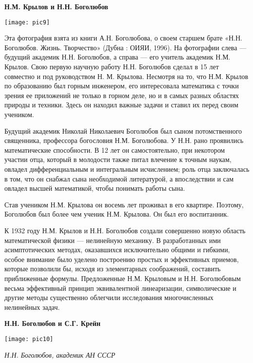 \begin{center}
{\bf Н.М. Крылов и Н.Н. Боголюбов}

\vspace{3mm}

\texttt{[image: pic9]}

\end{center}

Эта фотография взята из книги А.Н. Боголюбова, о своем старшем брате «Н.Н. Боголюбов. Жизнь. Творчество» (Дубна : ОИЯИ, 1996). На фотографии слева — будущий академик Н.Н. Боголюбов, а справа — его учитель академик Н.М. Крылов. Свою первую научную работу Н.Н. Боголюбов сделал в 15 лет совместно и под руководством Н. М. Крылова. Несмотря на то, что Н.М. Крылов по образованию был горным инженером, его интересовала математика с точки зрения ее приложений не только в горном деле, но и в самых разных областях природы и техники. Здесь он находил важные задачи и ставил их перед своим учеником.

Будущий академик Николай Николаевич Боголюбов был сыном потомственного священника, профессора богословия Н.М. Боголюбова. У Н.Н. рано проявились математические способности. В 12 лет он самостоятельно, при некотором участии отца, который в молодости также питал влечение к точным наукам, овладел дифференциальным и интегральным исчислением; роль отца заключалась в том, что он снабжал сына необходимой литературой, а впоследствии и сам овладел высшей математикой, чтобы понимать работы сына.

Став учеником Н.М. Крылова он восемь лет проживал в его квартире. Поэтому, Боголюбов был более чем ученик Н.М. Крылова. Он был его воспитанник.

 К 1932 году Н.М. Крылов и Н.Н. Боголюбов создали совершенно новую область математической физики — нелинейную механику. В разработанных ими асимптотических методах, оказавшихся исключительно общими и гибкими, особое внимание было уделено построению простых и эффективных приемов, которые позволили бы, исходя из элементарных соображений, составить приближенные формулы. Предложенные Н.М. Крыловым и Н.Н. Боголюбовым весьма эффективный принцип эквивалентной линеаризации, символические и другие методы существенно облегчили исследования многочисленных нелинейных задач.

\begin{center}
{\bf Н.Н. Боголюбов и С.Г. Крейн}

\texttt{[image: pic10]}


{\it Н.Н. Боголюбов, академик АН СССР}
\end{center}


